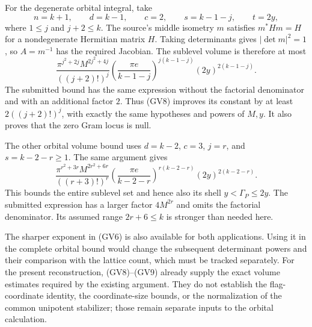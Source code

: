 For the degenerate orbital integral, take
\[
 n=k+1,\qquad d=k-1,\qquad c=2,\qquad
 s=k-1-j,\qquad t=2y,
\]
where $1\le j$ and $j+2\le k$.  The source's middle
isometry $m$ satisfies $m^*H m=H$ for a nondegenerate
Hermitian matrix $H$.  Taking determinants gives
$|\det m|^2=1$, so $A=m^{-1}$ has the required Jacobian.
The sublevel volume is therefore at most
\[
 \frac{\pi^{j^2+2j}M^{2j^2+4j}}{((j+2)!)^j}
     \left(\frac{\pi e}{k-1-j}\right)^{j(k-1-j)}
     (2y)^{2(k-1-j)}.                                        \tag{GV8}
\]
The submitted bound has the same expression without the
factorial denominator and with an additional factor $2$.
Thus (GV8) improves its constant by at least
$2((j+2)!)^j$, with exactly the same hypotheses and powers
of $M,y$.  It also proves that the zero Gram locus is null.

The other orbital volume bound uses
$d=k-2$, $c=3$, $j=r$, and $s=k-2-r\ge1$.
The same argument gives
\[
 \frac{\pi^{r^2+3r}M^{2r^2+6r}}{((r+3)!)^r}
      \left(\frac{\pi e}{k-2-r}\right)^{r(k-2-r)}
      (2y)^{2(k-2-r)}.                                       \tag{GV9}
\]
This bounds the entire sublevel set and hence also its shell
$y<\Gamma_P\le2y$.  The submitted expression has a larger
factor $4M^{2r}$ and omits the factorial denominator.
Its assumed range $2r+6\le k$ is stronger than needed here.

The sharper exponent in (GV6) is also available for both
applications.  Using it in the complete orbital bound would
change the subsequent determinant powers and their comparison
with the lattice count, which must be tracked separately.
For the present reconstruction, (GV8)--(GV9) already supply
the exact volume estimates required by the existing argument.
They do not establish the flag-coordinate identity, the
coordinate-size bounds, or the normalization of the common
unipotent stabilizer; those remain separate inputs to the
orbital calculation.


